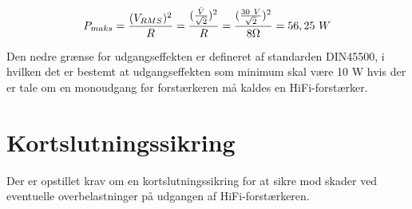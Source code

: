\begin{equation}
\label{equ:maks_effekt}
P_{maks} = \frac{(V_{RMS})^2}{R}= \frac{(\frac{\hat{V}}{\sqrt{2}})^2}{R} = \frac{(\frac{30~V}{\sqrt{2}})^2}{8\ohm} = 56,25~W
\end{equation}

Den nedre grænse for udgangseffekten er defineret af standarden DIN45500, i hvilken det er bestemt at udgangseffekten som minimum skal være 10 W hvis der er tale om en monoudgang før forstærkeren må kaldes en HiFi-forstærker.



\section{Kortslutningssikring}
\label{krav_kortslutningssikring}
Der er opstillet krav om en kortslutningssikring for at sikre mod skader ved eventuelle overbelastninger på udgangen af HiFi-forstærkeren.